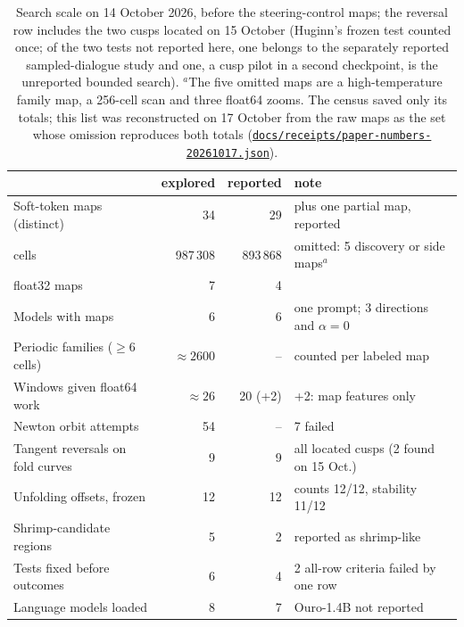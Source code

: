 \documentclass[11pt,letterpaper]{article}
\newcommand{\repourl}{https://github.com/tdj28/neural-shrimp}
\newcommand{\reporef}{arxiv-v1}
\newcommand{\repo}[1]{\href{\repourl/blob/\reporef/#1}{\nolinkurl{#1}}}
\begin{document}
\begin{table}[H]
\centering\small
\begin{tabular}{lrrl}
\toprule
 & explored & reported & note \\
\midrule
Soft-token maps (distinct) & 34 & 29 & plus one partial map, reported \\
\quad cells & 987\,308 & 893\,868 & omitted: 5 discovery or side maps$^{a}$ \\
\quad float32 maps & 7 & 4 & \\
Models with maps & 6 & 6 & one prompt; 3 directions and $\alpha=0$ \\
Periodic families ($\ge6$ cells) & $\approx2600$ & -- & counted per labeled map \\
Windows given float64 work & $\approx26$ & 20 (+2) & +2: map features only \\
Newton orbit attempts & 54 & -- & 7 failed \\
Tangent reversals on fold curves & 9 & 9 & all located cusps (2 found on 15 Oct.) \\
Unfolding offsets, frozen & 12 & 12 & counts 12/12, stability 11/12 \\
Shrimp-candidate regions & 5 & 2 & reported as shrimp-like \\
Tests fixed before outcomes & 6 & 4 & 2 all-row criteria failed by one row \\
Language models loaded & 8 & 7 & Ouro-1.4B not reported \\
\bottomrule
\end{tabular}
\caption{Search scale on 14 October 2026, before the steering-control maps; the reversal row includes the two cusps
located on 15 October (Huginn's frozen test counted once; of the two
tests not reported here, one belongs to the separately reported sampled-dialogue study and one, a cusp pilot in a
second checkpoint, is the unreported bounded search). $^{a}$The five omitted maps are a high-temperature family map,
a 256-cell scan and three float64 zooms. The census saved only its totals; this list was reconstructed on 17 October
from the raw maps as the set whose omission reproduces both totals (\repo{docs/receipts/paper-numbers-20261017.json}).}
\label{tab:search}
\end{table}
\end{document}
